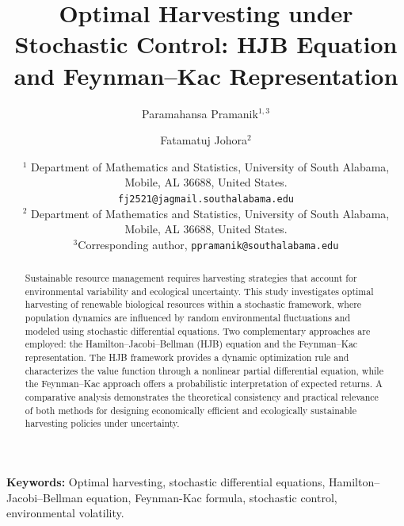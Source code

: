 \documentclass[11pt]{article}
\begin{document}
	
	
	\title{\bfseries Optimal Harvesting under Stochastic Control: HJB Equation and Feynman–Kac Representation }
	
	
	
	\author{
		Paramahansa Pramanik$^{1,3}$ \and 
		Fatamatuj Johora$^{2}$
	}
	
	\date{
		\small
		$^{1}$ Department of Mathematics and Statistics, University of South Alabama, Mobile, AL 36688, United States.\\
		\texttt{fj2521@jagmail.southalabama.edu}\\
		\vspace{0.5em}
		$^{2}$ Department of Mathematics and Statistics, University of South Alabama, Mobile, AL 36688, United States.\\
		$^{3}$Corresponding author, \texttt{ppramanik@southalabama.edu}
	}
	\maketitle
	
	\begin{abstract}
		Sustainable resource management requires harvesting strategies that account for environmental variability and ecological uncertainty. This study investigates optimal harvesting of renewable biological resources within a stochastic framework, where population dynamics are influenced by random environmental fluctuations and modeled using stochastic differential equations. Two complementary approaches are employed: the Hamilton–Jacobi–Bellman (HJB) equation and the Feynman–Kac representation. The HJB framework provides a dynamic optimization rule and characterizes the value function through a nonlinear partial differential equation, while the Feynman–Kac approach offers a probabilistic interpretation of expected returns. A comparative analysis demonstrates the theoretical consistency and practical relevance of both methods for designing economically efficient and ecologically sustainable harvesting policies under uncertainty.
		
	\end{abstract}
	
	{\bf Keywords:} Optimal harvesting, stochastic differential equations, Hamilton–Jacobi–Bellman equation, Feynman-Kac formula, stochastic control, environmental volatility.
	
\end{document}
